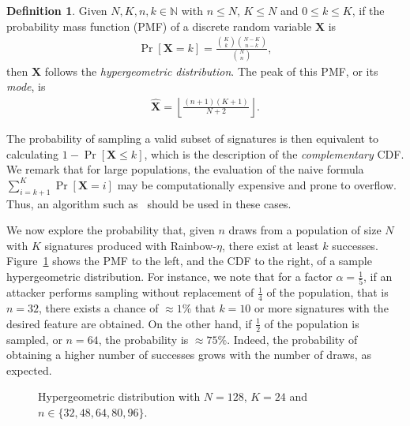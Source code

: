 \documentclass[12pt, a4paper, oneside]{memoir}
\theoremstyle{definition}
\newtheorem{definition}[theorem]{Definition}
\begin{document}
\begin{definition}
  Given $N, K, n, k \in \mathbb{N}$ with $n \leq N$, $K \leq N$ and $0 \leq k \leq K$, if the probability mass function (PMF) of a discrete random variable $\mathbf{X}$ is
  \begin{align}
    \Pr[\mathbf{X} = k] = \frac{\binom{K}{k}\binom{N - K}{n - k}}{\binom{N}{n}},
  \end{align}
  then $\mathbf{X}$ follows the \emph{hypergeometric distribution}. The peak of this PMF, or its \emph{mode}, is
  \begin{align}
    \widehat{\mathbf{X}} = \left\lfloor \frac{(n + 1)(K + 1)}{N + 2} \right\rfloor.
  \end{align}
\end{definition}

The probability of sampling a valid subset of signatures is then equivalent to calculating $1 - \Pr[\mathbf{X} \leq k]$, which is the description of the \emph{complementary} CDF. We remark that for large populations, the evaluation of the naive formula $\sum_{i = k + 1}^{K} \Pr[\mathbf{X} = i]$ may be computationally expensive and prone to overflow. Thus, an algorithm such as~\cite{Berkopec:200607} should be used in these cases.

We now explore the probability that, given $n$ draws from a population of size $N$ with $K$ signatures produced with Rainbow-$\eta$, there exist at least $k$ successes. Figure~\ref{fig:hyper} shows the PMF to the left, and the CDF to the right, of a sample hypergeometric distribution. For instance, we note that for a factor $\alpha = \frac{1}{5}$, if an attacker performs sampling without replacement of $\frac{1}{4}$ of the population, that is $n = 32$, there exists a chance of $\approx 1\%$ that $k = 10$ or more signatures with the desired feature are obtained. On the other hand, if $\frac{1}{2}$ of the population is sampled, or $n = 64$, the probability is $\approx 75\%$. Indeed, the probability of obtaining a higher number of successes grows with the number of draws, as expected.

\begin{figure}[htbp]
  \caption{Hypergeometric distribution with
    $N = 128$, $K = 24$ and $n \in \{32, 48, 64, 80, 96\}$.}\label{fig:hyper}
\end{figure}
\end{document}
